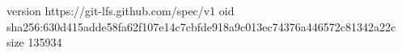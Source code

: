 version https://git-lfs.github.com/spec/v1
oid sha256:630d415adde58fa62f107e14c7cbfde918a9c013ec74376a446572c81342a22c
size 135934
